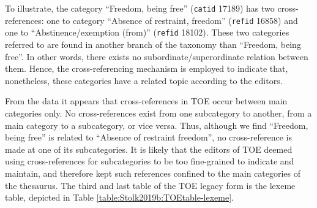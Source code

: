 To illustrate, the category “Freedom, being free” (\texttt{catid} 17189) has two cross-references: one to category “Absence of restraint, freedom” (\texttt{refid} 16858) and one to “Abstinence/exemption (from)” (\texttt{refid} 18102). These two categories referred to are found in another branch of the taxonomy than “Freedom, being free”. In other words, there exists no subordinate/superordinate relation between them. Hence, the cross-referencing mechanism is employed to indicate that, nonetheless, these categories have a related topic according to the editors.

From the data it appears that cross-references in TOE occur between main categories only. No cross-references exist from one subcategory to another, from a main category to a subcategory, or vice versa. Thus, although we find “Freedom, being free” is related to “Absence of restraint freedom”, no cross-reference is made at one of its subcategories. It is likely that the editors of TOE deemed using cross-references for subcategories to be too fine-grained to indicate and maintain, and therefore kept such references confined to the main categories of the thesaurus. The third and last table of the TOE legacy form is the lexeme table, depicted in Table \ref{table:Stolk2019b:TOEtable-lexeme}.

